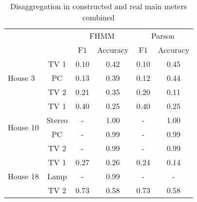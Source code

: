 \begin{table}[H]                             
\centering                                   
\begin{tabular}{lc|c|c|c|c|}
\cline{3-6}
                                                &        & \multicolumn{2}{c|}{FHMM} & \multicolumn{2}{c|}{Parson} \\ \cline{3-6} 
                                                &        & F1        & Accuracy      & F1         & Accuracy       \\ \hline
\multicolumn{1}{|l|}{\multirow{3}{*}{House 3}}  & TV 1   & 0.10      & 0.42          & 0.10       & 0.45           \\ \cline{2-6} 
\multicolumn{1}{|l|}{}                          & PC     & 0.13      & 0.39          & 0.12       & 0.44           \\ \cline{2-6} 
\multicolumn{1}{|l|}{}                          & TV 2   & 0.21      & 0.35          & 0.20       & 0.11           \\ \hline
\multicolumn{1}{|l|}{\multirow{4}{*}{House 10}} & TV 1   & 0.40      & 0.25          & 0.40       & 0.25           \\ \cline{2-6} 
\multicolumn{1}{|l|}{}                          & Stereo & -         & 1.00          & -          & 1.00           \\ \cline{2-6} 
\multicolumn{1}{|l|}{}                          & PC     & -         & 0.99          & -          & 0.99           \\ \cline{2-6} 
\multicolumn{1}{|l|}{}                          & TV 2   & -         & 0.99          & -          & 0.99           \\ \hline
\multicolumn{1}{|l|}{\multirow{3}{*}{House 18}} & TV 1   & 0.27      & 0.26          & 0.24       & 0.14           \\ \cline{2-6} 
\multicolumn{1}{|l|}{}                          & Lamp   & -         & 0.99          & -          & -              \\ \cline{2-6} 
\multicolumn{1}{|l|}{}                          & TV 2   & 0.73      & 0.58          & 0.73       & 0.58           \\ \hline
\end{tabular}                              
\caption{Disaggregation in constructed and real main meters combined}                     
\label{table:Tab:SHGSIMREAL}                 
\end{table}     